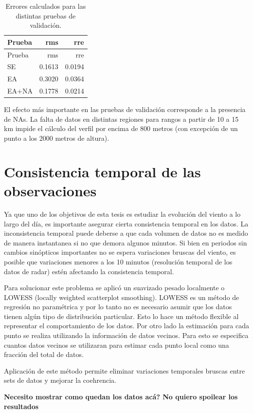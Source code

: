 \documentclass[12pt,spanish,oneside]{book}
\begin{document}
\begin{longtable}[]{@{}lrr@{}}
\caption{Errores calculados para las distintas pruebas de
validación.}\tabularnewline
\toprule
Prueba & rms & rre\tabularnewline
\midrule
\endfirsthead
\toprule
Prueba & rms & rre\tabularnewline
\midrule
\endhead
SE & 0.1613 & 0.0194\tabularnewline
EA & 0.3020 & 0.0364\tabularnewline
EA+NA & 0.1778 & 0.0214\tabularnewline
\bottomrule
\end{longtable}

El efecto más importante en las pruebas de validación corresponde a la
presencia de NAs. La falta de datos en distintas regiones para rangos a
partir de 10 a 15 km impide el cálculo del verfil por encima de 800
metros (con excepción de un punto a los 2000 metros de altura).

\section{Consistencia temporal de las
observaciones}\label{consistencia-temporal-de-las-observaciones}

Ya que uno de los objetivos de esta tesis es estudiar la evolución del
viento a lo largo del día, es importante asegurar cierta consistencia
temporal en los datos. La inconsistencia temporal puede deberse a que
cada volumen de datos no es medido de manera instantanea si no que
demora algunos minutos. Si bien en periodos sin cambios sinópticos
importantes no se espera variaciones bruscas del viento, es posible que
variaciones menores a los 10 minutos (resolución temporal de los datos
de radar) estén afectando la consistencia temporal.

Para solucionar este problema se aplicó un suavizado pesado localmente o
LOWESS (locally weighted scatterplot smoothing). LOWESS es un método de
regresión no paramétrica y por lo tanto no es necesario asumir que los
datos tienen algún tipo de distribución particular. Esto lo hace un
método flexible al representar el comportamiento de los datos. Por otro
lado la estimación para cada punto se realiza utilizando la información
de datos vecinos. Para esto se especifica cuantos datos vecinos se
utilizaran para estimar cada punto local como una fracción del total de
datos.

Aplicación de este método permite eliminar variaciones temporales
bruscas entre sets de datos y mejorar la coehrencia.

\textbf{Necesito mostrar como quedan los datos acá? No quiero spoilear
los resultados}
\end{document}
